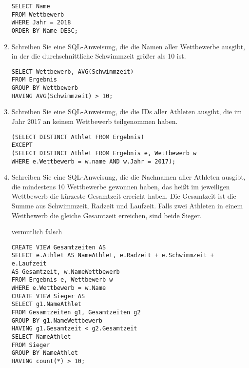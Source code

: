 \documentclass{bschlangaul-aufgabe}
\begin{document}
\begin{enumerate}
\begin{bAntwort}
\begin{verbatim}
SELECT Name
FROM Wettbewerb
WHERE Jahr = 2018
ORDER BY Name DESC;
\end{verbatim}
\end{bAntwort}


\item Schreiben Sie eine SQL-Anweisung, die die Namen aller Wettbewerbe
ausgibt, in der die durchschnittliche Schwimmzeit größer als 10 ist.

\begin{bAntwort}
\begin{verbatim}
SELECT Wettbewerb, AVG(Schwimmzeit)
FROM Ergebnis
GROUP BY Wettbewerb
HAVING AVG(Schwimmzeit) > 10;
\end{verbatim}
\end{bAntwort}


\item Schreiben Sie eine SQL-Anweisung, die die IDs aller Athleten
ausgibt, die im Jahr 2017 an keinem Wettbewerb teilgenommen haben.

\begin{bAntwort}
\begin{verbatim}
(SELECT DISTINCT Athlet FROM Ergebnis)
EXCEPT
(SELECT DISTINCT Athlet FROM Ergebnis e, Wettbewerb w
WHERE e.Wettbewerb = w.name AND w.Jahr = 2017);
\end{verbatim}
\end{bAntwort}


\item Schreiben Sie eine SQL-Anweisung, die die Nachnamen aller Athleten
ausgibt, die mindestens 10 Wettbewerbe gewonnen haben, das heißt im
jeweiligen Wettbewerb die kürzeste Gesamtzeit erreicht haben. Die
Gesamtzeit ist die Summe aus Schwimmzeit, Radzeit und Laufzeit. Falls
zwei Athleten in einem Wettbewerb die gleiche Gesamtzeit erreichen, sind
beide Sieger.

\begin{bAntwort}
vermutlich falsch
\begin{verbatim}
CREATE VIEW Gesamtzeiten AS
SELECT e.Athlet AS NameAthlet, e.Radzeit + e.Schwimmzeit + e.Laufzeit
AS Gesamtzeit, w.NameWettbewerb
FROM Ergebnis e, Wettbewerb w
WHERE e.Wettbewerb = w.Name
CREATE VIEW Sieger AS
SELECT g1.NameAthlet
FROM Gesamtzeiten g1, Gesamtzeiten g2
GROUP BY g1.NameWettbewerb
HAVING g1.Gesamtzeit < g2.Gesamtzeit
SELECT NameAthlet
FROM Sieger
GROUP BY NameAthlet
HAVING count(*) > 10;
\end{verbatim}
\end{bAntwort}


\end{enumerate}
\end{document}
